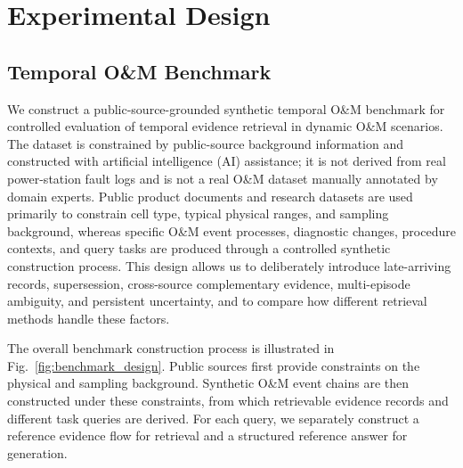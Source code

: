 \section{Experimental Design}
\label{sec:experiments}
\subsection{Temporal O\&M Benchmark}
\label{sec:dataset}

We construct a public-source-grounded synthetic temporal O\&M benchmark for controlled evaluation of temporal evidence retrieval in dynamic O\&M scenarios. The dataset is constrained by public-source background information and constructed with artificial intelligence (AI) assistance; it is not derived from real power-station fault logs and is not a real O\&M dataset manually annotated by domain experts. Public product documents and research datasets are used primarily to constrain cell type, typical physical ranges, and sampling background, whereas specific O\&M event processes, diagnostic changes, procedure contexts, and query tasks are produced through a controlled synthetic construction process. This design allows us to deliberately introduce late-arriving records, supersession, cross-source complementary evidence, multi-episode ambiguity, and persistent uncertainty, and to compare how different retrieval methods handle these factors.

The overall benchmark construction process is illustrated in Fig.~\ref{fig:benchmark_design}. Public sources first provide constraints on the physical and sampling background. Synthetic O\&M event chains are then constructed under these constraints, from which retrievable evidence records and different task queries are derived. For each query, we separately construct a reference evidence flow for retrieval and a structured reference answer for generation.

